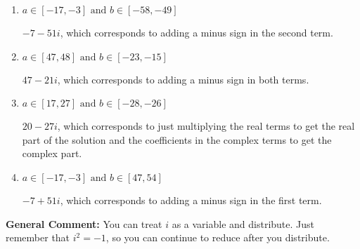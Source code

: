 \documentclass{extbook}[14pt]
\begin{document}
\begin{enumerate}
{\begin{enumerate}[label=\Alph*.]
* $47 + 21 i$, which is the correct option.
\item \( a \in [-17, -3] \text{ and } b \in [-58, -49] \)

 $-7 - 51 i$, which corresponds to adding a minus sign in the second term.
\item \( a \in [47, 48] \text{ and } b \in [-23, -15] \)

 $47 - 21 i$, which corresponds to adding a minus sign in both terms.
\item \( a \in [17, 27] \text{ and } b \in [-28, -26] \)

 $20 - 27 i$, which corresponds to just multiplying the real terms to get the real part of the solution and the coefficients in the complex terms to get the complex part.
\item \( a \in [-17, -3] \text{ and } b \in [47, 54] \)

 $-7 + 51 i$, which corresponds to adding a minus sign in the first term.
\end{enumerate}

\textbf{General Comment:} You can treat $i$ as a variable and distribute. Just remember that $i^2=-1$, so you can continue to reduce after you distribute.
}
\end{enumerate}
\end{document}
